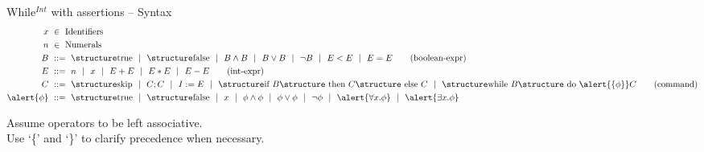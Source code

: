 \documentclass[aspectratio=169]{beamer}
\begin{document}
\begin{slide}{While$^{Int}$ with assertions -- Syntax}
\small
\begin{align*}
  x &~\in~ \text{Identifiers}
  \\
  n &~\in~ \text{Numerals}
  \\
  B &~::=~ \kw{true} ~~|~~ \kw{false} ~~|~~ B \land B ~~|~~ B \lor B ~~|~~ \lnot B ~~|~~ E<E ~~|~~ E=E
  \tag{boolean-expr}\\
  E &~::=~ n ~~|~~ x ~~|~~ E+E ~~|~~ E*E ~~|~~ E-E
  \tag{int-expr}\\
  C &~::=~ \kw {skip} ~~|~~ C;C ~~|~~ I:=E
    ~~|~~  \kw{if } B \kw{ then } C\kw{ else }C ~~|~~  \kw{while }B\kw{ do }\alert{\{\phi\}}C
  \tag{command}\\
  \alert{\phi} &~::=~ \kw{true} ~~|~~ \kw{false} ~~|~~ x ~~|~~ \phi \land \phi ~~|~~ \phi \lor \phi ~~|~~ \lnot \phi
    ~~|~~ \alert{\forall x.\phi} ~~|~~ \alert{\exists x.\phi}
\end{align*}

Assume operators to be left associative.
\\Use `\{' and `\}' to clarify precedence when necessary.

\end{slide}
\end{document}
